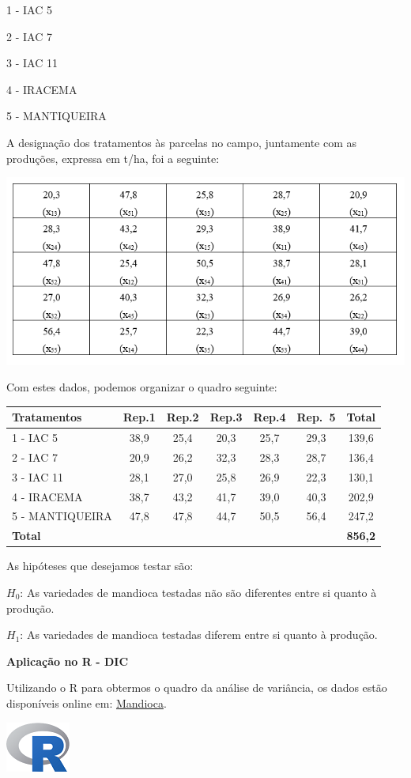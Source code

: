 \documentclass[
]{book}
\begin{document}
1 - IAC 5

2 - IAC 7

3 - IAC 11

4 - IRACEMA

5 - MANTIQUEIRA

A designação dos tratamentos às parcelas no campo, juntamente com as produções, expressa em t/ha, foi a seguinte:

\includegraphics{Delin1.png}

Com estes dados, podemos organizar o quadro seguinte:

\begin{longtable}[]{@{}lcccccc@{}}
\toprule
Tratamentos & Rep.1 & Rep.2 & Rep.3 & Rep.4 & Rep.~5 & Total\tabularnewline
\midrule
\endhead
1 - IAC 5 & 38,9 & 25,4 & 20,3 & 25,7 & 29,3 & 139,6\tabularnewline
2 - IAC 7 & 20,9 & 26,2 & 32,3 & 28,3 & 28,7 & 136,4\tabularnewline
3 - IAC 11 & 28,1 & 27,0 & 25,8 & 26,9 & 22,3 & 130,1\tabularnewline
4 - IRACEMA & 38,7 & 43,2 & 41,7 & 39,0 & 40,3 & 202,9\tabularnewline
5 - MANTIQUEIRA & 47,8 & 47,8 & 44,7 & 50,5 & 56,4 & 247,2\tabularnewline
\textbf{Total} & & & & & & \textbf{856,2}\tabularnewline
\bottomrule
\end{longtable}

As hipóteses que desejamos testar são:

\(H_0\): As variedades de mandioca testadas não são diferentes entre si quanto à produção.

\(H_1\): As variedades de mandioca testadas diferem entre si quanto à produção.

\textbf{Aplicação no R - DIC}

Utilizando o R para obtermos o quadro da análise de variância, os dados estão disponíveis online em: \href{https://raw.githubusercontent.com/arpanosso/curso_GIEU/master/dados/mandioca.txt}{Mandioca}.

\includegraphics{Rlogo.png}
\end{document}
